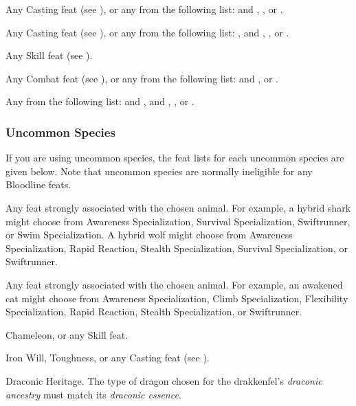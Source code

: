          Any Casting feat (see ), or any from the following list:  and , , or .

         Any Casting feat (see ), or any from the following list: ,  and , , or .

         Any Skill feat (see ).

         Any Combat feat (see ), or any from the following list:  and , or .

         Any from the following list:  and ,  and , , or .

        \subsubsection{Uncommon Species}
            If you are using uncommon species, the feat lists for each uncommon species are given below.
            Note that uncommon species are normally ineligible for any Bloodline feats.

             Any feat strongly associated with the chosen animal. For example, a hybrid shark might choose from Awareness Specialization, Survival Specialization, Swiftrunner, or Swim Specialization. A hybrid wolf might choose from Awareness Specialization, Rapid Reaction, Stealth Specialization, Survival Specialization, or Swiftrunner.

             Any feat strongly associated with the chosen animal. For example, an awakened cat might choose from Awareness Specialization, Climb Specialization, Flexibility Specialization, Rapid Reaction, Stealth Specialization, or Swiftrunner.

             Chameleon, or any Skill feat.

             Iron Will, Toughness, or any Casting feat (see ).

             Draconic Heritage. The type of dragon chosen for the drakkenfel's \textit{draconic ancestry} must match its \textit{draconic essence}.

